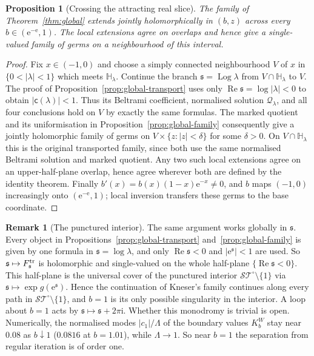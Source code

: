 \documentclass[11pt]{amsart}
\newtheorem{proposition}[theorem]{Proposition}
\theoremstyle{definition}
\newtheorem{remark}[theorem]{Remark}
\newcommand{\Kk}{K}
\newcommand{\eee}{\mathrm{e}}
\newcommand{\ii}{\mathrm{i}}
\begin{document}
\begin{proposition}[Crossing the attracting real slice]\label{prop:attracting-real-slice}
The family of Theorem~\ref{thm:global} extends jointly holomorphically in
$(b,z)$ across every $b\in(\eee^{-\eee},1)$.  The local extensions agree on
overlaps and hence give a single-valued family of germs on a neighbourhood
of this interval.
\end{proposition}

\begin{proof}
Fix $x\in(-1,0)$ and choose a simply connected neighbourhood $V$ of $x$
in $\{0<|\lambda|<1\}$ which meets $\mathbb H_\lambda$.  Continue the branch
$\mathfrak s=\operatorname{Log}\lambda$ from $V\cap\mathbb H_\lambda$ to $V$.  The proof of
Proposition~\ref{prop:global-transport} uses only
$\operatorname{Re}\mathfrak s=\log|\lambda|<0$ to obtain
$|\mathsf c(\lambda)|<1$.  Thus its Beltrami coefficient, normalised
solution $\mathcal Q_\lambda$, and all four conclusions hold on $V$ by exactly the
same formulas.  The marked quotient and its uniformisation in
Proposition~\ref{prop:global-family} consequently give a jointly
holomorphic family of germs on $V\times\{z:|z|<\delta\}$ for some
$\delta>0$.  On $V\cap\mathbb H_\lambda$ this is the original transported
family, since both use the same normalised Beltrami solution and marked
quotient.  Any two such local extensions agree on an upper-half-plane
overlap, hence agree wherever both are defined by the identity theorem.
Finally $b'(x)=b(x)(1-x)\eee^{-x}\ne0$, and $b$ maps $(-1,0)$
increasingly onto $(\eee^{-\eee},1)$; local inversion transfers these germs
to the base coordinate.
\end{proof}

\begin{remark}[The punctured interior]\label{rem:stcover}
The same argument works globally in $\mathfrak s$.  Every object in
Propositions~\ref{prop:global-transport} and~\ref{prop:global-family} is given by one
formula in $\mathfrak s=\log\lambda$, and only $\operatorname{Re}\mathfrak s<0$ and $|\eee^{\mathfrak s}|<1$ are used.  So $\mathfrak s\mapsto F^{\rm tr}_{\mathfrak s}$ is
holomorphic and single-valued on the whole half-plane $\{\operatorname{Re}\mathfrak s<0\}$.  This half-plane is
the universal cover of the punctured interior $\mathcal{ST}^\circ\setminus\{1\}$ via $\mathfrak s\mapsto\exp g(\eee^{\mathfrak s})$.
Hence the continuation of Kneser's family continues along every path in
$\mathcal{ST}^\circ\setminus\{1\}$, and $b=1$ is its only possible singularity in the interior.  A loop
about $b=1$ acts by $\mathfrak s\mapsto \mathfrak s+2\pi\ii$.  Whether this monodromy is trivial is open.
Numerically, the normalised modes $|c_1|/\Lambda$ of the boundary values $\Kk^W_b$ stay
near $0.08$ as $b\downarrow1$ ($0.0816$ at $b=1.01$), while $\Lambda\to1$.  So near $b=1$ the
separation from regular iteration is of order one.
\end{remark}
\end{document}
